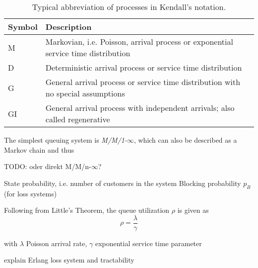 \begin{table}[htbp]
	\caption{Typical abbreviation of processes in Kendall's notation.}
	\label{c2:tbl:kendalldistributions}
	\begin{tabu}{X[l]X[6]}
	\toprule
	\textbf{Symbol} & \textbf{Description} \\
	\midrule
	M & Markovian, i.e. Poisson, arrival process or exponential service time distribution\\
	D & Deterministic arrival process or service time distribution\\
	G & General arrival process or service time distribution with no special assumptions\\
	GI & General arrival process with independent arrivals; also called regenerative \\ 
	\bottomrule
	\end{tabu} 
\end{table}

The simplest queuing system is \textit{M/M/1-$\infty$}, which can also be described as a Markov chain and thus 

TODO: oder direkt M/M/n-$\infty$?

State probability, i.e. number of customers in the system
Blocking probability $p_B$ (for loss systems)


Following from Little's Theorem, the queue utilization $\rho$ is given as
\begin{equation}
\rho = \frac{\lambda}{\gamma}
\end{equation}

with $\lambda$ Poisson arrival rate, $\gamma$ exponential service time parameter


explain Erlang loss system and tractability